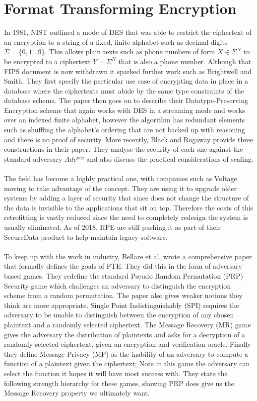 \documentclass[12pt,a4paper]{article}
\begin{document}
\pagebreak
\section{Format Transforming Encryption}

In 1981, NIST\cite{FIPS74} outlined a mode of DES that was able to restrict the ciphertext of an encryption to a string of a fixed, finite alphabet such as decimal digits $ \Sigma = \{0,1...9\} $. This allows plain texts such as phone numbers of form $ X \in \Sigma^N $ to be encrypted to a ciphertext $ Y = \Sigma^N $ that is also a phone number. Although that FIPS document is now withdrawn it sparked further work such as Brightwell and Smith\cite{DPE}. They first specify the particular use case of encrypting data in place in a database where the ciphertexts must abide by the same type constraints of the database schema. The paper then goes on to describe their  Datatype-Preserving Encryption scheme that again works with DES in a streaming mode and works over an indexed finite alphabet, however the algorithm has redundant elements such as shuffling the alphabet's ordering that are not backed up with reasoning and there is no proof of security. More recently, Black and Rogaway\cite{CAFD} provide three constructions in their paper. They analyse the security of each one against the standard adversary $Adv^{prp}$ and also discuss the practical considerations of scaling.
\\\\
The field has become a highly practical one, with companies such as Voltage moving to take advantage of the concept. They are using it to upgrade older systems by adding a layer of security that since does not change the structure of the data is invisible to the applications that sit on top. Therefore the costs of this retrofitting is vastly reduced since the need to completely redesign the system is usually eliminated. As of 2018, HPE\cite{hp} are still pushing it as part of their SecureData product to help maintain legacy software.
\\\\
To keep up with the work in industry, Bellare et al. wrote a comprehensive paper\cite{fpe} that formally defines the goals of FTE. They did this in the form of adversary based games. They redefine the standard Pseudo Random Permutation (PRP) Security game which challenges an adversary to distinguish the encryption scheme from a random permutation. The paper also gives weaker notions they think are more appropriate. Single Point Indistinguishably (SPI) requires the adversary to be unable to distinguish between the encryption of any chosen plaintext and a randomly selected ciphertext. The Message Recovery (MR) game gives the adversary the distribution of plaintexts and asks for a decryption of a randomly selected ciphertext, given an encryption and verification oracle. Finally they define Message Privacy (MP) as the inability of an adversary to compute a function of a plaintext given the ciphertext; Note in this game the adversary can select the function it hopes it will have most success with. They state the following strength hierarchy for these games, showing PRP does give us the Message Recovery property we ultimately want.
\end{document}

